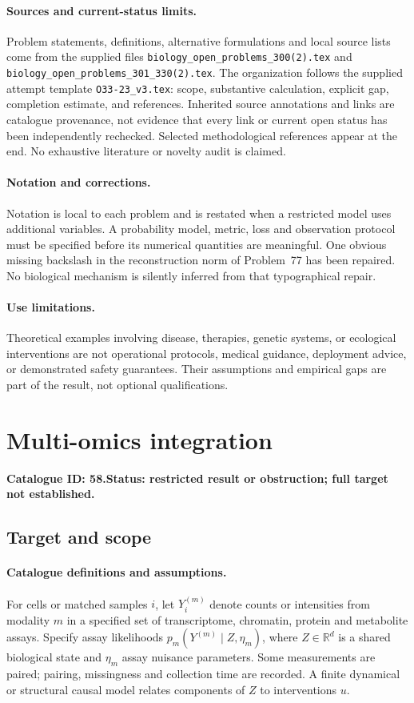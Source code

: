 \documentclass[11pt]{article}
\newcommand{\R}{\mathbb R}
\providecommand{\R}{\mathbb R}
\begin{document}
\paragraph{Sources and current-status limits.}
Problem statements, definitions, alternative formulations and local source lists
come from the supplied files
\texttt{biology\_open\_problems\_300(2).tex} and
\texttt{biology\_open\_problems\_301\_330(2).tex}.
The organization follows the supplied attempt template
\texttt{O33-23\_v3.tex}: scope, substantive calculation, explicit gap,
completion estimate, and references. Inherited source annotations and links are
catalogue provenance, not evidence that every link or current open status has
been independently rechecked. Selected methodological references appear at the
end. No exhaustive literature or novelty audit is claimed.

\paragraph{Notation and corrections.}
Notation is local to each problem and is restated when a restricted model uses
additional variables. A probability model, metric, loss and observation protocol
must be specified before its numerical quantities are meaningful. One obvious
missing backslash in the reconstruction norm of Problem~77 has been repaired.
No biological mechanism is silently inferred from that typographical repair.

\paragraph{Use limitations.}
Theoretical examples involving disease, therapies, genetic systems, or ecological
interventions are not operational protocols, medical guidance, deployment advice,
or demonstrated safety guarantees. Their assumptions and empirical gaps are part
of the result, not optional qualifications.

\setcounter{section}{57}
\section{Multi-omics integration}
\label{prob:058}
\noindent\textbf{Catalogue ID: 58.}\quad \textbf{Status: restricted result or obstruction; full target not established.}
\subsection{Target and scope}
\paragraph{Catalogue definitions and assumptions.}
For cells or matched samples $i$, let $Y_i^{(m)}$ denote counts or intensities from modality $m$ in a specified set of transcriptome, chromatin, protein and metabolite assays. Specify assay likelihoods $p_m(Y^{(m)}\mid Z,\eta_m)$, where $Z\in\R^d$ is a shared biological state and $\eta_m$ assay nuisance parameters. Some measurements are paired; pairing, missingness and collection time are recorded. A finite dynamical or structural causal model relates components of $Z$ to interventions $u$.
\end{document}
